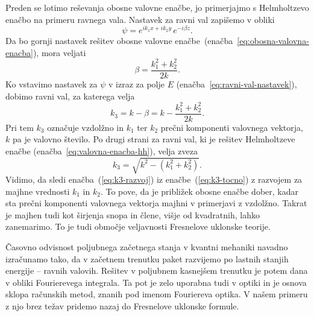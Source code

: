 Preden se lotimo reševanja obosne valovne enačbe, jo primerjajmo s Helmholtzevo enačbo
na primeru ravnega vala. Nastavek za ravni val  zapišemo v obliki
\begin{equation}
\psi=e^{ik_{1}x+ik_{2}y}\, e^{-i\beta z}.
\label{eq:ravni-val-nastavek-obosni}
\end{equation}
Da bo gornji nastavek rešitev
obosne valovne enačbe~(enačba~\ref{eq:obosna-valovna-enacba}), mora veljati 
\begin{equation}
\beta=\frac{k_{1}^{2}+k_{2}^{2}}{2k}.
\end{equation}
Ko vstavimo nastavek za $\psi$ v izraz za polje $E$ 
(enačba~\ref{eq:ravni-val-nastavek}), dobimo ravni val, za katerega velja 
\begin{equation}
k_{3}=k-\beta=k-\frac{k_{1}^{2}+k_{2}^{2}}{2k}.
\label{eq:k3-razvoj}
\end{equation}
Pri tem $k_{3}$ označuje vzdolžno in $k_{1}$ ter $k_{2}$ prečni komponenti valovnega 
vektorja, $k$ pa je valovno število. Po drugi strani za ravni val, ki je 
rešitev Helmholtzeve enačbe (enačba~\ref{eq:valovna-enacba-hh}), velja zveza
\begin{equation}
k_{3}=\sqrt{k^{2}-(k_{1}^{2}+k_{2}^{2})}.\label{eq:k3-tocno}
\end{equation}
Vidimo, da sledi enačba~(\ref{eq:k3-razvoj}) iz enačbe~(\ref{eq:k3-tocno})
z razvojem za majhne vrednosti $k_1$ in $k_2$. To pove, da je približek obosne 
enačbe dober, kadar sta prečni komponenti valovnega vektorja 
majhni v primerjavi z vzdolžno. 
Takrat je majhen tudi kot širjenja snopa in člene, višje od kvadratnih,
lahko zanemarimo. To je tudi območje veljavnosti Fresnelove uklonske
teorije.

\begin{remark}
Časovno odvisnost poljubnega začetnega
stanja v kvantni mehaniki navadno izračunamo tako, da v začetnem
trenutku paket razvijemo po lastnih stanjih energije -- ravnih valovih.
Rešitev v poljubnem kasnejšem trenutku je potem dana v obliki Fourierevega
integrala. Ta pot je zelo uporabna tudi v optiki in je osnova sklopa
računskih metod, znanih pod imenom Fouriereva optika. V našem primeru
z njo brez težav pridemo nazaj do Fresnelove uklonske formule.
\end{remark}

